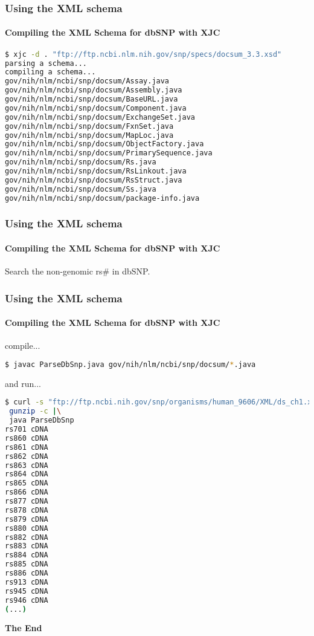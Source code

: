 \documentclass{beamer}
\newcommand{\centeredtitle}[1]{
\begin{center}
    \Huge{\bf{#1}}
\end{center}
}
\newcommand{\hugeslide}[1]{
\begin{frame}
\centeredtitle{#1}
\end{frame}
}
\begin{document}
\begin{frame}[fragile]
\frametitle{Using the XML schema}
\framesubtitle{Compiling the XML Schema for dbSNP with XJC}

\begin{lstlisting}[language=bash,basicstyle=\tiny,breaklines=false]
$ xjc -d . "ftp://ftp.ncbi.nlm.nih.gov/snp/specs/docsum_3.3.xsd"
parsing a schema...
compiling a schema...
gov/nih/nlm/ncbi/snp/docsum/Assay.java
gov/nih/nlm/ncbi/snp/docsum/Assembly.java
gov/nih/nlm/ncbi/snp/docsum/BaseURL.java
gov/nih/nlm/ncbi/snp/docsum/Component.java
gov/nih/nlm/ncbi/snp/docsum/ExchangeSet.java
gov/nih/nlm/ncbi/snp/docsum/FxnSet.java
gov/nih/nlm/ncbi/snp/docsum/MapLoc.java
gov/nih/nlm/ncbi/snp/docsum/ObjectFactory.java
gov/nih/nlm/ncbi/snp/docsum/PrimarySequence.java
gov/nih/nlm/ncbi/snp/docsum/Rs.java
gov/nih/nlm/ncbi/snp/docsum/RsLinkout.java
gov/nih/nlm/ncbi/snp/docsum/RsStruct.java
gov/nih/nlm/ncbi/snp/docsum/Ss.java
gov/nih/nlm/ncbi/snp/docsum/package-info.java
\end{lstlisting}
\end{frame}


\begin{frame}[fragile]
\frametitle{Using the XML schema}
\framesubtitle{Compiling the XML Schema for dbSNP with XJC}
Search the non-genomic rs\# in dbSNP.

\end{frame}

\begin{frame}[fragile]
\frametitle{Using the XML schema}
\framesubtitle{Compiling the XML Schema for dbSNP with XJC}
compile...
\begin{lstlisting}[language=bash,basicstyle=\tiny,breaklines=false]
$ javac ParseDbSnp.java gov/nih/nlm/ncbi/snp/docsum/*.java
\end{lstlisting}
and run...
\begin{lstlisting}[language=bash,basicstyle=\tiny,breaklines=false]
$ curl -s "ftp://ftp.ncbi.nih.gov/snp/organisms/human_9606/XML/ds_ch1.xml.gz" |\
 gunzip -c |\
 java ParseDbSnp
rs701 cDNA
rs860 cDNA
rs861 cDNA
rs862 cDNA
rs863 cDNA
rs864 cDNA
rs865 cDNA
rs866 cDNA
rs877 cDNA
rs878 cDNA
rs879 cDNA
rs880 cDNA
rs882 cDNA
rs883 cDNA
rs884 cDNA
rs885 cDNA
rs886 cDNA
rs913 cDNA
rs945 cDNA
rs946 cDNA
(...)
\end{lstlisting}
\end{frame}


\hugeslide{The End}
\end{document}
